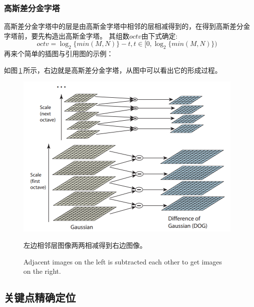 \documentclass[10.5pt,a4paper]{article}
\numberwithin{equation}{section}
\numberwithin{figure}{section}
\numberwithin{table}{section}
\renewcommand{\figurename}{图}
\begin{document}
\subsubsection{高斯差分金字塔}
\par
高斯差分金字塔中的层是由高斯金字塔中相邻的层相减得到的，在得到高斯差分金字塔前，要先构造出高斯金字塔。
其组数$octv$由下式确定:
\begin{equation}
octv = \log_2\{min(M,N)\}-t, t\in[0,\log_2\{min(M,N)\})
\end{equation}
再来个简单的插图与引用图的示例：\par
如图\,\ref{gaussianAndDog}\,所示，右边就是高斯差分金字塔，从图中可以看出它的形成过程。
\begin{figure}[htbp]
\centering
				\includegraphics[width=.8\textwidth]{gaussianAndDog.PNG}
\caption{左边相邻层图像两两相减得到右边图像\cite{lowe2004distinctive}。\label{gaussianAndDog}}
\addtocounter{figure}{-1}
\renewcommand{\figurename}{Figure}
\caption{Adjacent images on the left is subtracted each other to get images on the right\cite{lowe2004distinctive}.}
\end{figure}
\subsection{关键点精确定位}
\end{document}
